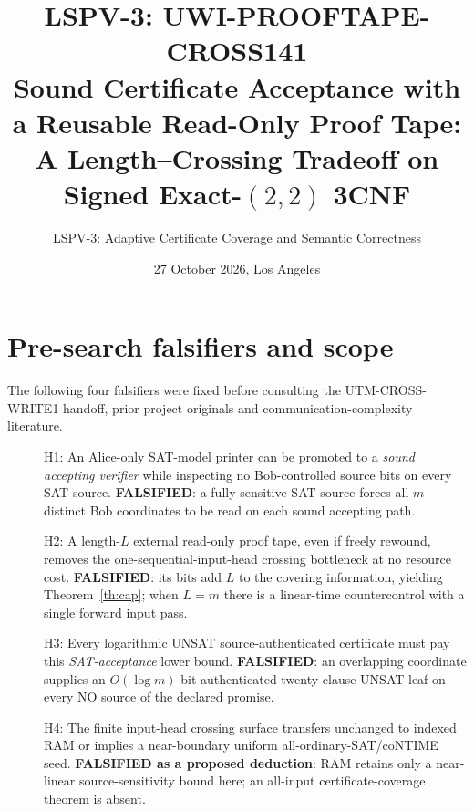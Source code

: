 \documentclass[11pt]{article}
\title{LSPV-3: UWI-PROOFTAPE-CROSS141\\\large Sound Certificate Acceptance with a Reusable Read-Only Proof Tape: A Length--Crossing Tradeoff on Signed Exact-$(2,2)$ 3CNF}
\author{LSPV-3: Adaptive Certificate Coverage and Semantic Correctness}
\date{27 October 2026, Los Angeles}
\begin{document}
\maketitle
\begin{center}
\end{center}

\section{Pre-search falsifiers and scope}
The following four falsifiers were fixed before consulting the UTM-CROSS-WRITE1 handoff, prior project originals and communication-complexity literature.
\begin{description}
\item[] H1: An Alice-only SAT-model printer can be promoted to a \emph{sound accepting verifier} while inspecting no Bob-controlled source bits on every SAT source. \textbf{FALSIFIED}: a fully sensitive SAT source forces all $m$ distinct Bob coordinates to be read on each sound accepting path.
\item[] H2: A length-$L$ external read-only proof tape, even if freely rewound, removes the one-sequential-input-head crossing bottleneck at no resource cost. \textbf{FALSIFIED}: its bits add $L$ to the covering information, yielding Theorem~\ref{th:cap}; when $L=m$ there is a linear-time countercontrol with a single forward input pass.
\item[] H3: Every logarithmic UNSAT source-authenticated certificate must pay this \emph{SAT-acceptance} lower bound. \textbf{FALSIFIED}: an overlapping coordinate supplies an $O(\log m)$-bit authenticated twenty-clause UNSAT leaf on every NO source of the declared promise.
\item[] H4: The finite input-head crossing surface transfers unchanged to indexed RAM or implies a near-boundary uniform all-ordinary-SAT/coNTIME seed. \textbf{FALSIFIED as a proposed deduction}: RAM retains only a near-linear source-sensitivity bound here; an all-input certificate-coverage theorem is absent.
\end{description}
\end{document}
